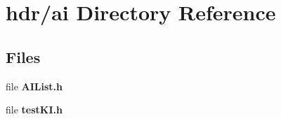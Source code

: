 \section{hdr/ai Directory Reference}
\label{dir_04cf6b94e5f246ace4dcca20476db399}
\subsection*{Files}
\begin{DoxyCompactItemize}
\item 
file {\bfseries A\-I\-List.\-h}
\item 
file {\bfseries test\-K\-I.\-h}
\end{DoxyCompactItemize}
